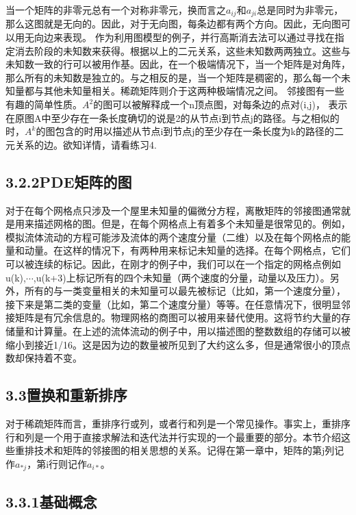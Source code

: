 \documentclass{article}
\begin{document}
\newline
当一个矩阵的非零元总有一个对称非零元，换而言之$a_{ij}$和$a_{ji}$总是同时为非零元，那么这图就是无向的。因此，对于无向图，每条边都有两个方向。因此，无向图可以用无向边来表现。
\newline
作为利用图模型的例子，并行高斯消去法可以通过寻找在指定消去阶段的未知数来获得。根据以上的二元关系，这些未知数两两独立。这些与未知数一致的行可以被用作基。因此，在一个极端情况下，当一个矩阵是对角阵，那么所有的未知数是独立的。与之相反的是，当一个矩阵是稠密的，那么每一个未知量都与其他未知量相关。稀疏矩阵则介于这两种极端情况之间。
\newline
邻接图有一些有趣的简单性质。$A^2$的图可以被解释成一个n顶点图，对每条边的点对(i,j)， 表示在原图A中至少存在一条长度确切的说是2的从节点i到节点j的路径。与之相似的时，$A^k$的图包含的时用以描述从节点i到节点j的至少存在一条长度为k的路径的二元关系的边。欲知详情，请看练习4.
\newline
\subsection*{3.2.2PDE矩阵的图}

对于在每个网格点只涉及一个屋里未知量的偏微分方程，离散矩阵的邻接图通常就是用来描述网格的图。但是，在每个网格点上有着多个未知量是很常见的。例如，模拟流体流动的方程可能涉及流体的两个速度分量（二维）以及在每个网格点的能量和动量。在这样的情况下，有两种用来标记未知量的选择。在每个网格点，它们可以被连续的标记。因此，在刚才的例子中，我们可以在一个指定的网格点例如u(k),$\cdots$,u(k+3)上标记所有的四个未知量（两个速度的分量，动量以及压力）。另外，所有的与一类变量相关的未知量可以最先被标记（比如，第一个速度分量），接下来是第二类的变量（比如，第二个速度分量）等等。在任意情况下，很明显邻接矩阵是有冗余信息的。物理网格的商图可以被用来替代使用。这将节约大量的存储量和计算量。在上述的流体流动的例子中，用以描述图的整数数组的存储可以被缩小到接近1/16。这是因为边的数量被所见到了大约这么多，但是通常很小的顶点数却保持着不变。
\newline
\subsection*{3.3置换和重新排序}

对于稀疏矩阵而言，重排序行或列，或者行和列是一个常见操作。事实上，重排序行和列是一个用于直接求解法和迭代法并行实现的一个最重要的部分。本节介绍这些重排技术和矩阵的邻接图的相关思想的关系。记得在第一章中，矩阵的第j列记作$a_{*j}$，第i行则记作$a_{i*}$。
\newline
\subsection*{3.3.1基础概念}
\end{document}
